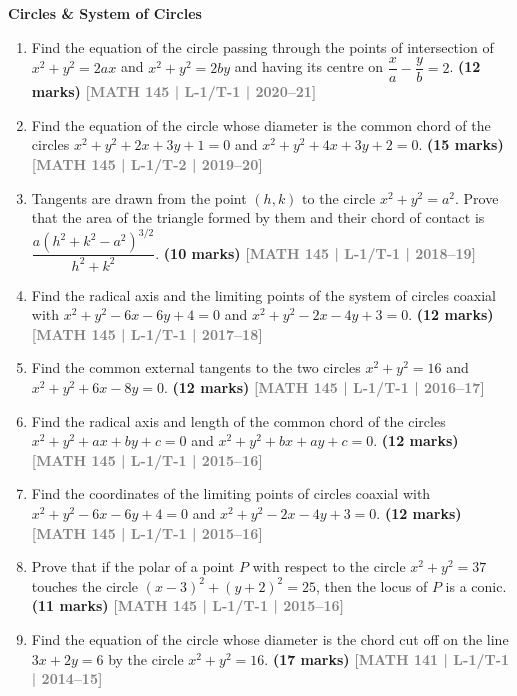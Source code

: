 \documentclass[12pt,a4paper]{article}
\newcommand{\yr}[1]{\hfill\textcolor{gray}{\small\textbf{[#1]}}}
\newcommand{\mk}[1]{\textcolor{orange!70!black}{\small\textbf{(#1 marks)}}}
\newcommand{\subtopic}[2]{%
  \vspace{10pt}
  \noindent\begin{tcolorbox}[colback=#1!8,colframe=#1,boxrule=0.6pt,arc=4pt,
    left=6pt,right=6pt,top=4pt,bottom=4pt]
    \small\bfseries\textcolor{#1}{#2}
  \end{tcolorbox}
  \vspace{2pt}
}
\begin{document}
\subtopic{cH}{Circles \& System of Circles}
\label{sub:s10-circles}

\begin{enumerate}\item Find the equation of the circle passing through the points of intersection of $x^{2}+y^{2}=2ax$ and $x^{2}+y^{2}=2by$ and having its centre on $\dfrac{x}{a}-\dfrac{y}{b}=2$.
\mk{12} \yr{MATH 145 | L-1/T-1 | 2020--21}



\item Find the equation of the circle whose diameter is the common chord of the circles $x^{2}+y^{2}+2x+3y+1=0$ and $x^{2}+y^{2}+4x+3y+2=0$.
\mk{15} \yr{MATH 145 | L-1/T-2 | 2019--20}

\item Tangents are drawn from the point $(h,k)$ to the circle $x^{2}+y^{2}=a^{2}$. Prove that the area of the triangle formed by them and their chord of contact is $\dfrac{a(h^{2}+k^{2}-a^{2})^{3/2}}{h^{2}+k^{2}}$.
\mk{10} \yr{MATH 145 | L-1/T-1 | 2018--19}

\item Find the radical axis and the limiting points of the system of circles coaxial with $x^{2}+y^{2}-6x-6y+4=0$ and $x^{2}+y^{2}-2x-4y+3=0$.
\mk{12} \yr{MATH 145 | L-1/T-1 | 2017--18}

\item Find the common external tangents to the two circles $x^{2}+y^{2}=16$ and $x^{2}+y^{2}+6x-8y=0$.
\mk{12} \yr{MATH 145 | L-1/T-1 | 2016--17}

\item Find the radical axis and length of the common chord of the circles $x^{2}+y^{2}+ax+by+c=0$ and $x^{2}+y^{2}+bx+ay+c=0$.
\mk{12} \yr{MATH 145 | L-1/T-1 | 2015--16}

\item Find the coordinates of the limiting points of circles coaxial with $x^{2}+y^{2}-6x-6y+4=0$ and $x^{2}+y^{2}-2x-4y+3=0$.
\mk{12} \yr{MATH 145 | L-1/T-1 | 2015--16}

\item Prove that if the polar of a point $P$ with respect to the circle $x^{2}+y^{2}=37$ touches the circle $(x-3)^{2}+(y+2)^{2}=25$, then the locus of $P$ is a conic.
\mk{11} \yr{MATH 145 | L-1/T-1 | 2015--16}

\item Find the equation of the circle whose diameter is the chord cut off on the line $3x+2y=6$ by the circle $x^{2}+y^{2}=16$.
\mk{17} \yr{MATH 141 | L-1/T-1 | 2014--15}


\end{enumerate}
\end{document}
